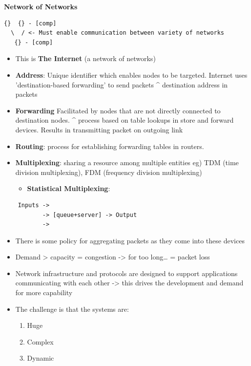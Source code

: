 \documentclass[11pt]{article}
\begin{document}
\textbf{Network of Networks}

\begin{verbatim}
{}  {} - [comp]
  \  / <- Must enable communication between variety of networks
   {} - [comp]
\end{verbatim}

\begin{itemize}
\item This is \textbf{The Internet} (a network of networks)

\item \textbf{Address}: Unique identifier which enables nodes to be targeted. Internet uses 'destination-based forwarding' to send packets
\^{} destination address in packets
\item \textbf{Forwarding} Facilitated by nodes that are not directly connected to
destination nodes. 
\^{} process based on table lookups in store and forward devices. Results in transmitting packet on outgoing link
\item \textbf{Routing}: process for establishing forwarding tables in routers.
\item \textbf{Multiplexing}: sharing a resource among multiple entities
eg) TDM (time division multiplexing), FDM (frequency division
multiplexing)
\begin{itemize}
\item \textbf{Statistical Multiplexing}:
\end{itemize}
\end{itemize}

\begin{verbatim}
    Inputs -> 
           -> [queue+server] -> Output
           ->
\end{verbatim}

\begin{itemize}
\item There is some policy for aggregating packets as they come into
these devices
\item Demand > capacity = congestion
-> for too long\ldots{} = packet loss
\end{itemize}
\begin{itemize}
\item Network infrastructure and protocols are designed to support
applications communicating with each other
-> this drives the development and demand for more capability
\item The challenge is that the systems are:
\begin{enumerate}
\item Huge
\item Complex
\item Dynamic
\end{enumerate}
\end{itemize}
\end{document}
